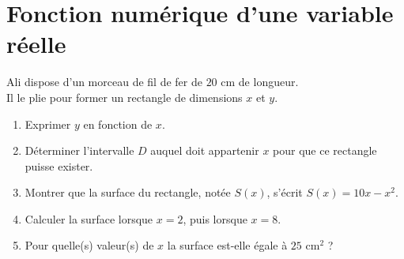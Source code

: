 \documentclass[10pt, a4paper]{article}
\begin{document}
\pagestyle{cours}

\section{Fonction numérique d'une variable réelle }

\begin{Activite}[][20 min]
\noindent
\begin{minipage}[c]{0.7\linewidth}
    Ali dispose d’un morceau de fil de fer de $20$ cm de longueur. \\
    Il le plie pour former un rectangle de dimensions $x$ et $y$.
    \begin{enumerate}[leftmargin=*,itemsep=0.5pt]
        \item Exprimer $y$ en fonction de $x$.
        \item Déterminer l'intervalle $D$ auquel doit appartenir $x$ pour que ce rectangle puisse exister.
        \item Montrer que la surface du rectangle, notée $S(x)$, s'écrit $S(x) = 10x - x^2$.
        \item Calculer la surface lorsque $x = 2$, puis lorsque $x = 8$.
        \item Pour quelle(s) valeur(s) de $x$ la surface est-elle égale à $25\text{ cm}^2$ ?
    \end{enumerate}
\end{minipage}
\hfill
\begin{minipage}[c]{0.3\linewidth}
    \centering
\end{minipage}%
\end{Activite}
\end{document}
